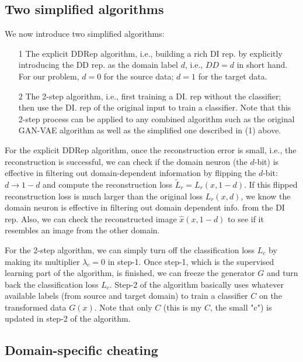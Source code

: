 \documentclass{article}
\begin{document}
{%

\subsection{Two simplified algorithms}

We now introduce two simplified algorithms: 
\begin{itemize}
\item[1] The explicit DDRep algorithm, i.e., building a rich DI rep. by explicitly introducing the DD rep. as the domain label $d$, i.e., $DD=d$ in short hand. For our problem, $d=0$ for the source data; $d=1$ for the target data.
\item[2] The 2-step algorithm, i.e., first training a DI. rep without the classifier; then use the DI. rep of the original input to train a classifier. Note that this 2-step process can be applied to any combined 
algorithm such as the original GAN-VAE algorithm as well as the simplified one described in (1) above.
\end{itemize}

For the explicit DDRep algorithm, once the reconstruction error is small, i.e., the reconstruction is successful, we can check if the domain neuron (the $d$-bit) is effective in filtering out domain-dependent information by flipping the $d$-bit: $d\rightarrow 1-d$ and compute the reconstruction loss $\tilde{L}_r=L_r(x,1-d)$. If this flipped reconstruction loss is much larger than the original loss $L_r(x,d)$, we know the domain neuron is effective in filtering out domain dependent info. from the DI rep. Also, we can check the reconstructed image $\hat{x}(x,1-d)$ to see if it resembles an image from the other domain. 

For the 2-step algorithm, we can simply turn off the classification loss $L_c$ by making its multiplier $\lambda_c=0$ in step-1. Once step-1, which is the supervised learning part of the algorithm, is finished, we can freeze the generator $G$ and turn back the classification loss $L_c$. Step-2 of the algorithm basically uses whatever available labels (from source and target domain) to train a classifier $C$ on the transformed data $G(x)$. Note that only $C$ (this is my $C$, the small "c") is updated in step-2 of the algorithm. 




\subsection{Domain-specific cheating}

}
\end{document}

